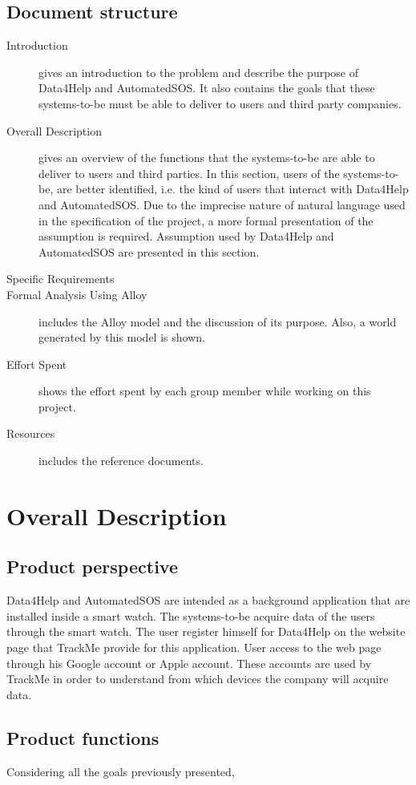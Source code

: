 \documentclass{article}
\begin{document}
\subsection{Document structure}
\begin{description}
	\item [Introduction] gives an introduction to the problem and describe the purpose of Data4Help and AutomatedSOS. It also contains the goals that these systems-to-be must be able to deliver to users and third party companies.
	\item [Overall Description] gives an overview of the functions that the systems-to-be are able to deliver to users and third parties. In this section, users of the systems-to-be, are better identified, i.e. the kind of users that interact with Data4Help and AutomatedSOS. Due to the imprecise nature of natural language used in the specification of the project, a more formal presentation of the assumption is required. Assumption used by Data4Help and AutomatedSOS are presented in this section. 
	\item [Specific Requirements]
	\item [Formal Analysis Using Alloy] includes the Alloy model and the discussion of its purpose. Also, a world generated by this model is shown.
	\item [Effort Spent] shows the effort spent by each group member while working on this project.
	\item [Resources] includes the reference documents. 
\end{description}
\section{Overall Description}
\subsection{Product perspective}
Data4Help and AutomatedSOS are intended as a background application that are installed inside a smart watch. The systems-to-be acquire data of the users through the smart watch. The user register himself for Data4Help on the website page that TrackMe provide for this application. User access to the web page through his Google account or Apple account. These accounts are used by TrackMe in order to understand from which devices the company will acquire data.  
\subsection{Product functions}
Considering all the goals previously presented, 
\end{document}
